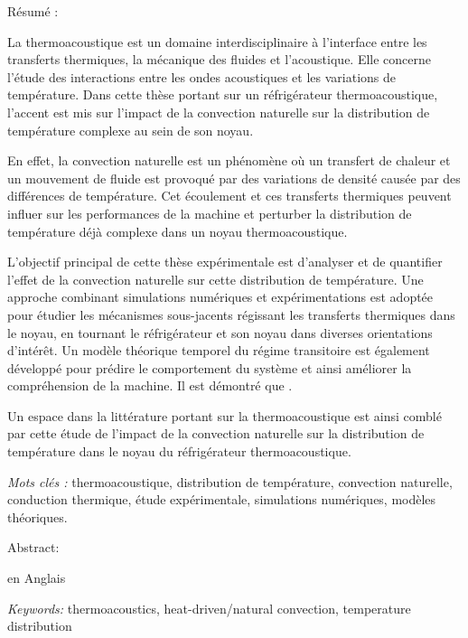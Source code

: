 {

\vfill

{\Large Résumé :}\medskip

La thermoacoustique est un domaine interdisciplinaire à l'interface entre les transferts thermiques, la mécanique des fluides et l'acoustique. Elle concerne l'étude des interactions entre les ondes acoustiques et les variations de température. Dans cette thèse portant sur un réfrigérateur thermoacoustique, l'accent est mis sur l'impact de la convection naturelle sur la distribution de température complexe au sein de son noyau.

En effet, la convection naturelle est un phénomène où un transfert de chaleur et un mouvement de fluide est provoqué par des variations de densité causée par des différences de température. Cet écoulement et ces transferts thermiques peuvent influer sur les performances de la machine et  perturber la distribution de température déjà complexe dans un noyau thermoacoustique.

L'objectif principal de cette thèse expérimentale est d'analyser et de quantifier l'effet de la convection naturelle sur cette distribution de température. Une approche combinant simulations numériques et expérimentations est adoptée pour étudier les mécanismes sous-jacents régissant les transferts thermiques dans le noyau, en tournant le réfrigérateur et son noyau dans diverses orientations d'intérêt. Un modèle théorique temporel du régime transitoire est également développé pour prédire le comportement du système et ainsi améliorer la compréhension de la machine. Il est démontré que .

Un espace dans la littérature portant sur la thermoacoustique est ainsi comblé par cette étude de l'impact de la convection naturelle sur la distribution de température dans le noyau du réfrigérateur thermoacoustique.

\bigskip

{\large \textit{Mots clés :}} thermoacoustique,  distribution de température, convection naturelle, conduction thermique, étude expérimentale, simulations numériques, modèles théoriques.

\vfill

{\Large Abstract:}\medskip

en Anglais

\bigskip

{\large \textit{Keywords:}} thermoacoustics, heat-driven/natural convection, temperature distribution

\vfill
}